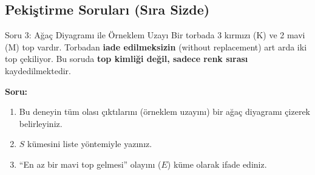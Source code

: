 \documentclass[light]{lutbeamer}
\begin{document}
\subsection{Pekiştirme Soruları (Sıra Sizde)}

\begin{frame}{Soru 3: Ağaç Diyagramı ile Örneklem Uzayı}
    Bir torbada 3 kırmızı (K) ve 2 mavi (M) top vardır. Torbadan \textbf{iade edilmeksizin} (without replacement) art arda iki top çekiliyor.
    Bu soruda \textbf{top kimliği değil, sadece renk sırası} kaydedilmektedir.
    
    \textbf{Soru:}
    \begin{enumerate}
        \item[(a)] Bu deneyin tüm olası çıktılarını (örneklem uzayını) bir ağaç diyagramı çizerek belirleyiniz.
        \item[(b)] $S$ kümesini liste yöntemiyle yazınız.
        \item[(c)] ``En az bir mavi top gelmesi'' olayını ($E$) küme olarak ifade ediniz.
    \end{enumerate}
\end{frame}
\end{document}
